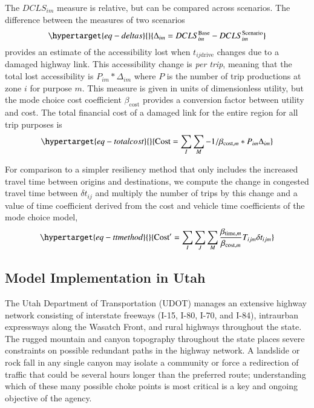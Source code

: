 \documentclass[
  letterpaper,
  number,
  review,
  3p]{elsarticle}
\begin{document}
The \(DCLS_{im}\) measure is relative, but can be compared across
scenarios. The difference between the measures of two scenarios
\begin{equation}\protect\hypertarget{eq-deltas}{}{
\Delta_{im} = DCLS_{im}^{\mathrm{Base}} - DCLS_{im}^{\mathrm{Scenario}}
}\label{eq-deltas}\end{equation} provides an estimate of the
accessibility lost when \(t_{ij\mathrm{drive}}\) changes due to a
damaged highway link. This accessibility change is \emph{per trip},
meaning that the total lost accessibility is \(P_{im} * \Delta_{im}\)
where \(P\) is the number of trip productions at zone \(i\) for purpose
\(m\). This measure is given in units of dimensionless utility, but the
mode choice cost coefficient \(\beta_{\mathrm{cost}}\) provides a
conversion factor between utility and cost. The total financial cost of
a damaged link for the entire region for all trip purposes is
\begin{equation}\protect\hypertarget{eq-totalcost}{}{
\mathrm{Cost} = \sum_{I}\sum_{M} -1 / \beta_{\mathrm{cost},m} * P_{im} \Delta_{im}
}\label{eq-totalcost}\end{equation}

For comparison to a simpler resiliency method that only includes the
increased travel time between origins and destinations, we compute the
change in congested travel time between \(\delta t_{ij}\) and multiply
the number of trips by this change and a value of time coefficient
derived from the cost and vehicle time coefficients of the mode choice
model, \begin{equation}\protect\hypertarget{eq-ttmethod}{}{
\mathrm{Cost}' =  \sum_I \sum_J \sum_M \frac{\beta_{\mathrm{time}, m} }{\beta_{\mathrm{cost}, m}} T_{ijm} \delta t_{ijm}
}\label{eq-ttmethod}\end{equation}

\hypertarget{model-implementation-in-utah}{%
\subsection{Model Implementation in
Utah}\label{model-implementation-in-utah}}

The Utah Department of Transportation (UDOT) manages an extensive
highway network consisting of interstate freeways (I-15, I-80, I-70, and
I-84), intraurban expressways along the Wasatch Front, and rural
highways throughout the state. The rugged mountain and canyon topography
throughout the state places severe constraints on possible redundant
paths in the highway network. A landslide or rock fall in any single
canyon may isolate a community or force a redirection of traffic that
could be several hours longer than the preferred route; understanding
which of these many possible choke points is most critical is a key and
ongoing objective of the agency.
\end{document}
